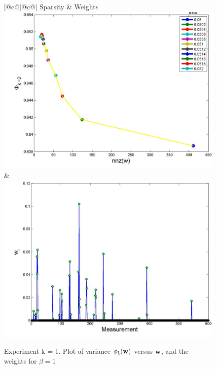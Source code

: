 \documentclass[12pt]{article}
\newcommand{\bfw}	{{\bf{w}}}
\begin{document}
\begin{figure}[!h]
	\renewcommand{\arraystretch}{1.5}
	\begin{center}
		\iwidth=100mm
		\begin{tabular}{{|@{}c@{}|@{}c@{}|}} %
			\hline		
			Sparsity
			&
			Weights			
			\\
			\hline		
			\includegraphics[width=.8\iwidth]{figures/exp2paretoWeights}
			&
			\includegraphics[width=.8\iwidth]{figures/exp2Weights}
			\\
			\hline
		\end{tabular}
	\end{center}
	\caption{Experiment k = 1. Plot of variance $\phi_1(\bfw)$ versus $\bfw$, and the weights for $\beta = 1$ }
	\label{fig:weights1}
\end{figure}
\end{document}
